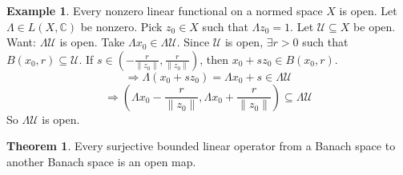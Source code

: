 \documentclass{article}
\theoremstyle{definition}
\newtheorem{thm}{Theorem}
\newtheorem{ex}{Example}
\begin{document}
\begin{ex}
	Every nonzero linear functional on a normed space $X$ is open.
	Let $\Lambda \in L(X, \mathbb{C})$ be nonzero.
	Pick $z_0 \in X$ such that $\Lambda z_0 = 1$.
	Let $\mathcal{U} \subseteq X$ be open.
	Want: $\Lambda \mathcal{U}$ is open.
	Take $\Lambda x_0 \in \Lambda \mathcal{U}$.
	Since $\mathcal{U}$ is open, $\exists r > 0$ such that $B(x_0, r)\subseteq \mathcal{U}$.
	If $s \in \left(-\frac{r}{\|z_0\|}, \frac{r}{\|z_0\|} \right)$, then $x_0 + sz_0 \in B(x_0, r)$.
	\[
		\Rightarrow \Lambda(x_0 + s z_0) = \Lambda x_0 + s \in \Lambda \mathcal{U}
	\]
	\[
		\Rightarrow \left( \Lambda x_0 - \frac{r}{\|z_0\|}, \Lambda x_0 + \frac{r}{\|z_0\|} \right) \subseteq \Lambda \mathcal{U}
	\]
	So $\Lambda \mathcal{U}$ is open.
\end{ex}

\begin{thm}
	Every surjective bounded linear operator from a Banach space to another Banach space is an open map.
\end{thm}
\end{document}
